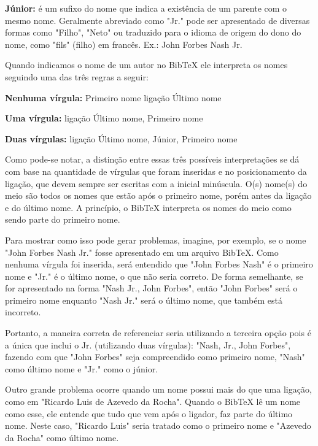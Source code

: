 \begin{anexosenv}
\begin{compactitem}
\item \textbf{Júnior:} é um sufixo do nome que indica a existência de um parente com o mesmo nome. Geralmente abreviado como "Jr."{} pode ser apresentado de diversas formas como "Filho"{}, "Neto"{} ou traduzido para o idioma de origem do dono do nome, como "fils"{} (filho) em francês. Ex.: John Forbes Nash Jr.
\end{compactitem}

Quando indicamos o nome de um autor no BibTeX ele interpreta os nomes seguindo uma das três regras a seguir:

\begin{compactenum}
	\item \textbf{Nenhuma vírgula:} {Primeiro nome} {ligação} {Último nome}

	\item \textbf{Uma vírgula:} {ligação} {Último nome}, {Primeiro nome}

	\item \textbf{Duas vírgulas:} {ligação} {Último nome}, {Júnior}, {Primeiro nome}
\end{compactenum}

Como pode-se notar, a distinção entre essas três possíveis interpretações se dá com base na quantidade de vírgulas que foram inseridas e no posicionamento da ligação, que devem sempre ser escritas com a inicial minúscula. O(s) nome(s) do meio são todos os nomes que estão após o primeiro nome, porém antes da ligação e do último nome. A princípio, o BibTeX interpreta os nomes do meio como sendo parte do primeiro nome.

Para mostrar como isso pode gerar problemas, imagine, por exemplo, se o nome "John Forbes Nash Jr."{} fosse apresentado em um arquivo BibTeX. Como nenhuma vírgula foi inserida, será entendido que "John Forbes Nash"{} é o primeiro nome e "Jr."{} é o último nome, o que não seria correto. De forma semelhante, se for apresentado na forma "Nash Jr., John Forbes", então "John Forbes"{} será o primeiro nome enquanto "Nash Jr."{} será o último nome, que também está incorreto.

Portanto, a maneira correta de referenciar seria utilizando a terceira opção pois é a única que inclui o Jr. (utilizando duas vírgulas): "Nash, Jr., John Forbes"{}, fazendo com que "John Forbes"{} seja compreendido como primeiro nome, "Nash"{} como último nome e "Jr."{} como o júnior.

Outro grande problema ocorre quando um nome possui mais do que uma ligação, como em "Ricardo Luis de Azevedo da Rocha"{}. Quando o BibTeX lê um nome como esse, ele entende que tudo que vem após o ligador, faz parte do último nome. Neste caso, "Ricardo Luis"{} seria tratado como o primeiro nome e "Azevedo da Rocha"{} como último nome.


\end{anexosenv}
